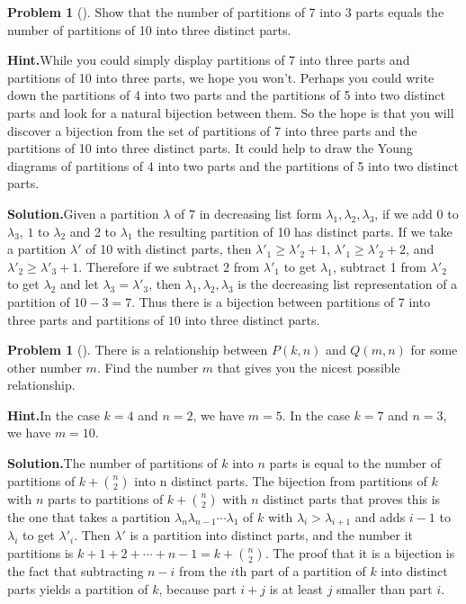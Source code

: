 \documentclass[10pt,]{book}
\theoremstyle{plain}
\theoremstyle{definition}
\newtheorem{activity}[project]{Problem}
\theoremstyle{definition}
\numberwithin{equation}{chapter}
\begin{document}
\begin{activity}[]\label{activity-173}
Show that the number of partitions of 7 into 3 parts equals the number of partitions of 10 into three distinct parts.%
\par\medskip\noindent%
\textbf{Hint.}\quad While you could simply display partitions of 7 into three parts and partitions of 10 into three parts, we hope you won't. Perhaps you could write down the partitions of 4 into two parts and the partitions of 5 into two distinct parts and look for a natural bijection between them. So the hope is that you will discover a bijection from the set of partitions of 7 into three parts and the partitions of 10 into three distinct parts. It could help to draw the Young diagrams of partitions of 4 into two parts and the partitions of 5 into two distinct parts.%
\par\medskip\noindent%
\textbf{Solution.}\quad Given a partition \(\lambda\) of 7 in decreasing list form \(\lambda_1,\lambda_2,\lambda_3\), if we add 0 to \(\lambda_3\), \(1\) to \(\lambda_2\) and 2 to \(\lambda_1\) the resulting partition of 10 has distinct parts. If we take a partition \(\lambda'\) of 10 with distinct parts, then \(\lambda'_1\ge\lambda'_2+1\), \(\lambda'_1\ge\lambda'_2+2\), and \(\lambda'_2\ge \lambda'_3+1\). Therefore if we subtract 2 from \(\lambda'_1\) to get \(\lambda_1\), subtract 1 from \(\lambda'_2\) to get \(\lambda_2\) and let \(\lambda_3= \lambda'_3\), then \(\lambda_1,\lambda_2,\lambda_3\) is the decreasing list representation of a partition of \(10-3=7\). Thus there is a bijection between partitions of \(7\) into three parts and partitions of \(10\) into three distinct parts.%
\end{activity}
\begin{activity}[]\label{activity-174}
There is a relationship between \(P(k,n)\) and \(Q(m,n)\) for some other number \(m\). Find the number \(m\) that gives you the nicest possible relationship.%
\par\medskip\noindent%
\textbf{Hint.}\quad In the case \(k=4\) and \(n=2\), we have \(m=5\). In the case \(k = 7\) and \(n = 3\), we have \(m = 10\).%
\par\medskip\noindent%
\textbf{Solution.}\quad The number of partitions of \(k\) into \(n\) parts is equal to the number of partitions of \(k+\binom{n}{2}\) into n distinct parts.  The bijection from partitions of \(k\) with \(n\) parts to partitions of \(k+\binom{n}{2}\) with \(n\) distinct parts that proves this is the one that takes a partition \(\lambda_n\lambda_{n-1}\cdots\lambda_1\) of \(k\) with \(\lambda_i>\lambda_{i+1}\) and adds \(i-1\) to \(\lambda_i\) to get \(\lambda'_i\). Then \(\lambda'\) is a partition into distinct parts, and the number it partitions is \(k+1+2+\cdots+n-1=k+\binom{n}{2}\). The proof that it is a bijection is the fact that subtracting \(n-i\) from the \(i\)\/th part of a partition of \(k\) into distinct parts yields a partition of \(k\), because part \(i+j\) is at least \(j\) smaller than part \(i\).%
\end{activity}
\end{document}
